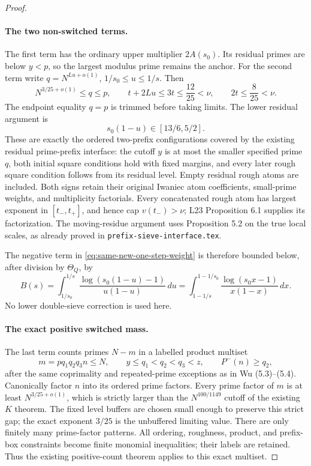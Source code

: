 \documentclass[11pt]{article}
\begin{document}
\begin{proof}
\paragraph{The two non-switched terms.}
The first term has the ordinary upper multiplier $2A(s_0)$.
Its residual primes are below $y<p$, so the largest modulus prime
remains the anchor. For the second term write
$q=N^{Lu+o(1)}$, $1/s_0\le u\le1/s$. Then
\[
 N^{3/25+o(1)}\le q\le p,\qquad
 t+2Lu\le3t\le\frac{12}{25}<\nu,\qquad
 2t\le\frac8{25}<\nu.
\]
The endpoint equality $q=p$ is trimmed before taking limits.
The lower residual argument is
\[
 s_0(1-u)\in[13/6,5/2].
\]
These are exactly the ordered two-prefix configurations covered by
the existing residual prime-prefix interface: the cutoff $y$ is at
most the smaller specified prime $q$, both initial square conditions
hold with fixed margins, and every later rough square condition
follows from its residual level. Empty residual rough atoms are
included. Both signs retain their original Iwaniec atom coefficients,
small-prime weights, and multiplicity factorials. Every concatenated
rough atom has largest exponent in $[t_-,t_+]$, and hence cap
$v(t_-)> \nu$; L23 Proposition 6.1 supplies its factorization.
The moving-residue argument uses Proposition 5.2 on the true local
scales, as already proved in \texttt{prefix-sieve-interface.tex}.

The negative term in \eqref{eq:same-new-one-step-weight} is therefore
bounded below, after division by $\Theta_Q$, by
\[
 B(s)=\int_{1/s_0}^{1/s}
  \frac{\log(s_0(1-u)-1)}{u(1-u)}\,du
 =\int_{1-1/s}^{1-1/s_0}
  \frac{\log(s_0x-1)}{x(1-x)}\,dx.
\]
No lower double-sieve correction is used here.

\paragraph{The exact positive switched mass.}
The last term counts primes $N-m$ in a labelled product multiset
\[
 m=pq_1q_2q_3n\le N,\qquad
 y\le q_1<q_2<q_3<z,\qquad P^-(n)\ge q_2,
\]
after the same coprimality and repeated-prime exceptions as in
Wu (5.3)--(5.4). Canonically factor $n$ into its ordered prime factors.
Every prime factor of $m$ is at least $N^{3/25+o(1)}$, which is
strictly larger than the $N^{100/1149}$ cutoff of the existing
$K$ theorem. The fixed level buffers are chosen small enough to
preserve this strict gap; the exact exponent $3/25$ is the unbuffered
limiting value. There are only finitely many prime-factor patterns.
All ordering, roughness, product, and prefix-box constraints become
finite monomial inequalities; their labels are retained. Thus the
existing positive-count theorem applies to this exact multiset.


\end{proof}
\end{document}
